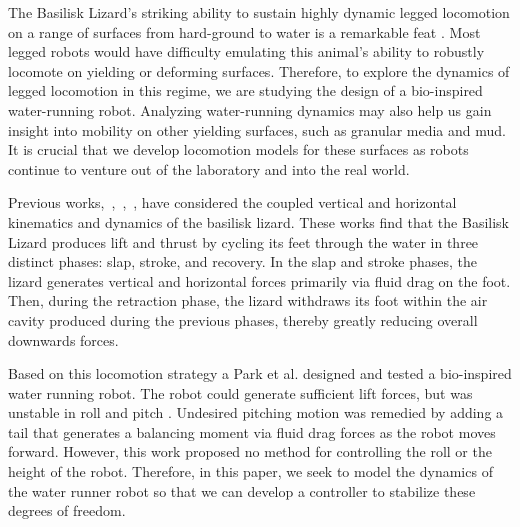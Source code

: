 The Basilisk Lizard's striking ability to sustain highly dynamic legged locomotion on a range of surfaces from hard-ground to water is a remarkable feat \cite{glasheen1996hydrodynamic}. Most legged robots would have difficulty emulating this animal's ability to robustly locomote on yielding or deforming surfaces. Therefore, to explore the dynamics of legged locomotion in this regime, we are studying the design of a bio-inspired water-running robot. Analyzing water-running dynamics may also help us gain insight into mobility on other yielding surfaces, such as granular media and mud. It is crucial that we develop locomotion models for these surfaces as robots continue to venture out of the laboratory and into the real world.

Previous works,~\cite{glasheen1996hydrodynamic},~\cite{floyd2008design},~\cite{hsieh2004running}, have considered the coupled vertical and horizontal kinematics and dynamics of the basilisk lizard. These works find that the Basilisk Lizard produces lift and thrust by cycling its feet through the water in three distinct phases: slap, stroke, and recovery. In the slap and stroke phases, the lizard generates vertical and horizontal forces primarily via fluid drag on the foot. Then, during the retraction phase, the lizard withdraws its foot within the air cavity produced during the previous phases, thereby greatly reducing overall downwards forces. 

Based on this locomotion strategy a Park et al. designed and tested a bio-inspired water running robot. The robot could generate sufficient lift forces, but was unstable in roll and pitch \cite{park2010roll}. Undesired pitching motion was remedied by adding a tail that generates a balancing moment via fluid drag forces as the robot moves forward. However, this work proposed no method for controlling the roll or the height of the robot. Therefore, in this paper, we seek to model the dynamics of the water runner robot so that we can develop a controller to stabilize these degrees of freedom. 
